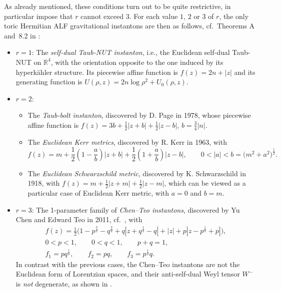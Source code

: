 \documentclass[10pt,a4paper]{amsart}
\numberwithin{equation}{section}
\begin{document}
As already mentioned, these conditions turn out to be quite restrictive, in particular impose that $r$ cannot exceed $3$. For each value $1$, $2$ or $3$ of $r$, the only toric Hermitian ALF gravitational instantons are then as follows, cf.\ Theorems A and~8.2 in \cite{BG}:
\begin{itemize}\itemsep=0pt
\item $r = 1$: The {\it self-dual Taub-NUT instanton}, i.e., the Euclidean self-dual Taub-NUT on $\mathbb{R} ^4$, with the orientation opposite to the one induced by its hyperk\"ahler structure. Its piecewise affine function is $f (z) = 2 n + |z|$ and its generating function is $U (\rho, z) = 2 n \log{\rho ^2} + U _0 (\rho, z)$.
\item $r = 2$: \begin{itemize}\itemsep=0pt
\item[(i)] The {\it Taub-bolt instanton}, discovered by D. Page in 1978, whose piecewise affine function is $f (z) = 3 b + \frac{1}{2} |z + b| + \frac{1}{2} |z - b|$, $b = \frac{3}{4} |n|$.
 \item[(ii)] The {\it Euclidean Kerr metrics}, discovered by R. Kerr in 1963, with
 \[f (z) = m + \frac{1}{2} \left(1 - \frac{a}{b}\right) |z + b| + \frac{1}{2} \left(1 + \frac{a}{b}\right) |z - b|, \qquad 0 < |a| < b = \big(m ^2 + a^2\big) ^{\frac{1}{2}}.\]
 \item[(iii)] The {\it Euclidean Schwarzschild metric}, discovered by K. Schwarzschild in 1918, with $f (z) = m + \frac{1}{2} |z + m| + \frac{1}{2} |z - m|$, which can be viewed as a particular case of Euclidean Kerr metric, with $a = 0$ and $b = m$.
\end{itemize}
 \item $r = 3$: The 1-parameter family of {\it Chen--Teo instantons}, discovered by Yu Chen and Edward Teo in 2011, cf.\ \cite{CT2}, with
 \begin{gather} f (z) = \frac{1}{2} \big(1 - p ^{\frac{3}{2}} - q ^{\frac{3}{2}} + q |z + q ^{\frac{1}{2}} - q| + |z| + p |z - p ^{\frac{1}{2}} + p|\big), \label{f-CT}\\
 0 < p < 1, \qquad 0 < q < 1, \qquad p + q = 1, \label{pq-CT} \\
 f _1 = p q ^{\frac{1}{2}}, \qquad f_2 = p q, \qquad f_3 = p^{\frac{1}{2}} q.\label{fi-CT}
 \end{gather}
 In contrast with the previous cases, the Chen--Teo instantons are not the Euclidean form of Lorentzian spaces, and their anti-self-dual Weyl tensor $W ^-$ is {\it not} degenerate, as shown in \cite{AA}.
\end{itemize}
\end{document}
